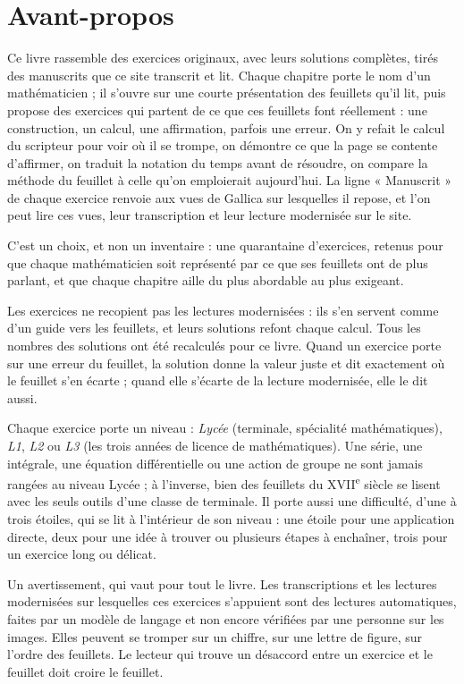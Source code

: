 \documentclass[11pt,a4paper]{article}
\begin{document}
\livretitre

\section*{Avant-propos}

Ce livre rassemble des exercices originaux, avec leurs solutions complètes,
tirés des manuscrits que ce site transcrit et lit. Chaque chapitre porte le nom
d'un mathématicien ; il s'ouvre sur une courte présentation des feuillets qu'il
lit, puis propose des exercices qui partent de ce que ces feuillets font
réellement : une construction, un calcul, une affirmation, parfois une erreur.
On y refait le calcul du scripteur pour voir où il se trompe, on démontre ce que
la page se contente d'affirmer, on traduit la notation du temps avant de
résoudre, on compare la méthode du feuillet à celle qu'on emploierait
aujourd'hui. La ligne « Manuscrit » de chaque exercice renvoie aux vues de
Gallica sur lesquelles il repose, et l'on peut lire ces vues, leur transcription
et leur lecture modernisée sur le site.

C'est un choix, et non un inventaire : une quarantaine d'exercices, retenus pour
que chaque mathématicien soit représenté par ce que ses feuillets ont de plus
parlant, et que chaque chapitre aille du plus abordable au plus exigeant.

Les exercices ne recopient pas les lectures modernisées : ils s'en servent comme
d'un guide vers les feuillets, et leurs solutions refont chaque calcul. Tous les
nombres des solutions ont été recalculés pour ce livre. Quand un exercice porte
sur une erreur du feuillet, la solution donne la valeur juste et dit exactement
où le feuillet s'en écarte ; quand elle s'écarte de la lecture modernisée, elle
le dit aussi.

Chaque exercice porte un niveau : \emph{Lycée} (terminale, spécialité
mathématiques), \emph{L1}, \emph{L2} ou \emph{L3} (les trois années de licence
de mathématiques). Une série, une intégrale, une équation différentielle ou une
action de groupe ne sont jamais rangées au niveau Lycée ; à l'inverse, bien des
feuillets du XVII\textsuperscript{e} siècle se lisent avec les seuls outils
d'une classe de terminale. Il porte aussi une difficulté, d'une à trois
étoiles, qui se lit à l'intérieur de son niveau : une étoile pour une
application directe, deux pour une idée à trouver ou plusieurs étapes à
enchaîner, trois pour un exercice long ou délicat.

Un avertissement, qui vaut pour tout le livre. Les transcriptions et les
lectures modernisées sur lesquelles ces exercices s'appuient sont des lectures
automatiques, faites par un modèle de langage et non encore vérifiées par une
personne sur les images. Elles peuvent se tromper sur un chiffre, sur une
lettre de figure, sur l'ordre des feuillets. Le lecteur qui trouve un désaccord
entre un exercice et le feuillet doit croire le feuillet.
\end{document}
